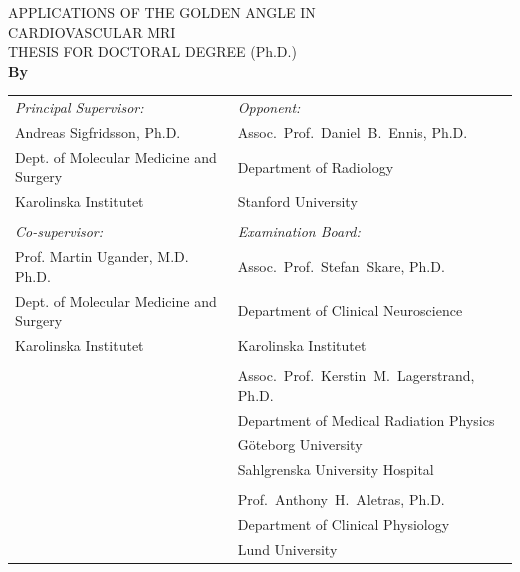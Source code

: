 \newpage 
\thispagestyle{empty} %
{\huge \sffamily APPLICATIONS OF THE GOLDEN ANGLE IN\\[3mm] CARDIOVASCULAR MRI\\[6mm]}
{\huge \sffamily THESIS FOR DOCTORAL DEGREE (Ph.D.)\\[6mm]}
{\Large \bfseries \sffamily By \\[6mm]}
{\Large \bfseries \sffamily \myName}
\vfill
{\footnotesize
\noindent
\begin{tabularx}{\textwidth}{XX}
\textit{Principal Supervisor:} & \textit{Opponent:}\\
Andreas Sigfridsson, Ph.D. & Assoc.~Prof.~Daniel~B.~Ennis, Ph.D.\\
Dept. of Molecular Medicine and Surgery & Department of Radiology\\
Karolinska Institutet &  Stanford University\\
& \\
\textit{Co-supervisor:} & \textit{Examination Board:}\\
Prof. Martin Ugander, M.D. Ph.D. & Assoc.~Prof.~Stefan~Skare, Ph.D.\\
Dept. of Molecular Medicine and Surgery & Department of Clinical Neuroscience\\
Karolinska Institutet & Karolinska Institutet\\
& \\
& Assoc.~Prof.~Kerstin~M.~Lagerstrand, Ph.D.\\
& Department of Medical Radiation Physics \\
& Göteborg University \\
& Sahlgrenska University Hospital\\
& \\
& Prof.~Anthony~H.~Aletras, Ph.D.\\
& Department of Clinical Physiology \\
& Lund University\\
\end{tabularx}

}
